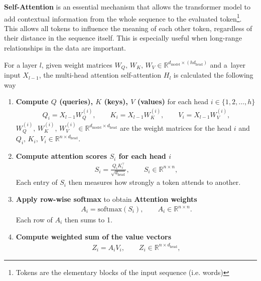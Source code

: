 \textbf{Self-Attention} is an essential mechanism that allows the transformer model to add contextual information from the whole sequence to the evaluated token\footnote{Tokens are the elementary blocks of the input sequence (i.e. words)}.
This allows all tokens to influence the meaning of each other token, regardless of their distance in the sequence itself.
This is especially useful when long-range relationships in the data are important.

\bigskip

\noindent For a layer $l$, given weight matrices $W_Q, \, W_K, \, W_V \in \mathbb{R}^{d_{\mathrm{model}} \times (h d_{\mathrm{head}})}$ and a~layer input $X_{l-1}$, the multi-head attention self-attention $H_l$ is calculated the following way

        {\setlength{\jot}{1em}
\begin{enumerate}
    \item \textbf{Compute $Q$ (queries), $K$ (keys), $V$ (values)} for each head $i \in \{1, 2, \dots, h\}$
    \begin{align}
        Q_i = X_{l-1}W^{(i)}_Q,
        \qquad
        K_i = X_{l-1}W^{(i)}_K,
        \qquad
        V_i = X_{l-1}W^{(i)}_V,
    \end{align}
    $W_Q^{(i)}, \, W_K^{(i)}, \, W_V^{(i)} \in \mathbb{R}^{d_{\mathrm{model}} \times d_{\mathrm{head}}}$ are the weight matrices for the head $i$ and $Q_i, \, K_i, \, V_i \in \mathbb{R}^{n \times d_{\mathrm{head}}}$.
    \item \textbf{Compute attention scores $S_i$ for each head $i$}
    \begin{align}
        S_i = \frac{Q_{i}K_{i}^{\top}}{\sqrt{d_{\mathrm{head}}}},
        \qquad S_i \in \mathbb{R}^{n \times n},
    \end{align}
    Each entry of $S_i$ then measures how strongly a token attends to another.
    \item \textbf{Apply row-wise softmax} to obtain \textbf{Attention weights}
    \begin{align}
        A_i = \mathrm{softmax}(S_i),
        \qquad
        A_i \in \mathbb{R}^{n \times n}.
    \end{align}
    Each row of $A_i$ then sums to 1.
    \item \textbf{Compute weighted sum of the value vectors}
    \begin{align}
        Z_i = A_i V_i,
        \qquad
        Z_i \in \mathbb{R}^{n \times d_{\mathrm{head}}},
    \end{align}

\end{enumerate}}
